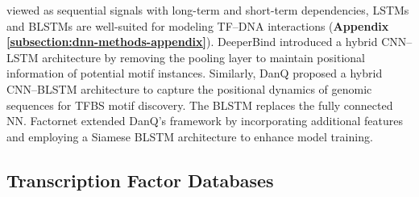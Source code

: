 \documentclass[a4paper, titlepage, openright]{book}
\begin{document}
viewed as sequential signals with long-term and short-term dependencies, LSTMs and BLSTMs are well-suited for modeling TF–DNA interactions (\textbf{Appendix \ref{subsection:dnn-methods-appendix}}). DeeperBind \citep{hassanzadeh2016deeperbind} introduced a hybrid CNN–LSTM architecture by removing the pooling layer to maintain positional information of potential motif instances. Similarly, DanQ \citep{quang2016danq} proposed a hybrid CNN–BLSTM architecture to capture the positional dynamics of genomic sequences for TFBS motif discovery. The BLSTM replaces the fully connected NN. Factornet \citep{quang2019factornet} extended DanQ's framework by incorporating additional features and employing a Siamese BLSTM architecture to enhance model training.

\subsection{Transcription Factor Databases}
\end{document}
